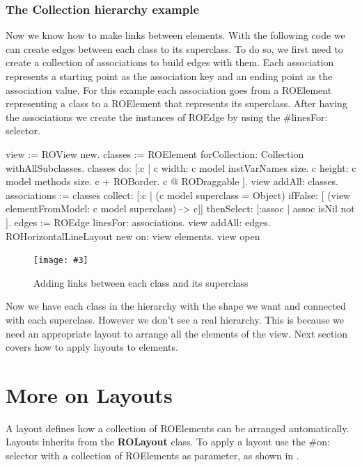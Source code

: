 \documentclass[a4paper,10pt,twoside]{book}
\newcommand{\fig}[4]{
		\begin{figure}[#1]
			\centering
			\texttt{[image: \#3]}
			\caption{\label{fig:#3}#4}
		\end{figure}}
\begin{document}
\subsubsection*{The Collection hierarchy example}
Now we know how to make links between elements. With the following code we can create edges between each class to its superclass. To do so, we first need to create a collection of associations to build edges with them. Each association represents a starting point as the association key and an ending point as the association value. For this example each association goes from a ROElement representing a class to a ROElement that represents its superclass. After having the associations we create the instances of ROEdge by using the \#linesFor: selector.

\begin{code}{}
view := ROView new.
classes := ROElement forCollection: Collection withAllSubclasses.
classes do: [:c | 
	c width: c model instVarNames size.
	c height: c model methods size.
	c + ROBorder. 
	c @ RODraggable ].
view addAll: classes.
associations := classes 
					collect: [:c | 	(c model superclass = Object)
										ifFalse: [ (view elementFromModel: c model superclass) -> c]]
					thenSelect: [:assoc | assoc isNil not ].
edges := ROEdge linesFor: associations.
view addAll: edges.
ROHorizontalLineLayout new on: view elements.
view open
\end{code}

\fig{H}{0.6}{hier3}{Adding links between each class and its superclass}

Now we have each class in the  hierarchy with the shape we want and connected with each superclass. However we don't see a real hierarchy. This is because we need an appropriate layout to arrange all the elements of the view. Next section covers how to apply layouts to elements.


\section{More on Layouts} 
A layout defines how a collection of ROElements can be arranged automatically. Layouts inherits from the \textbf{ROLayout} class. To apply a layout use the \#on: selector with a collection of ROElements as parameter, as shown in .
\end{document}
